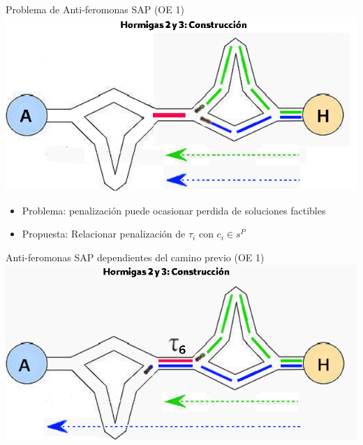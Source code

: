 \begin{frame}{Problema de Anti-feromonas SAP (OE 1)}
\centering
\includegraphics[scale=0.4]{Pictures/ACO-ant-constr-penalize.png}
    \begin{itemize}
        \item Problema: penalizaci\'on puede ocasionar perdida de soluciones factibles
        \item Propuesta: Relacionar penalizaci\'on de $\tau_i$ con $c_i \in s^P$
    \end{itemize}
\end{frame}

\begin{frame}{Anti-feromonas SAP dependientes del camino previo (OE 1)}
    \centering
    \includegraphics[scale=0.51]{Pictures/ACO-ant-ferom-penalize-seg.png}
\end{frame}


